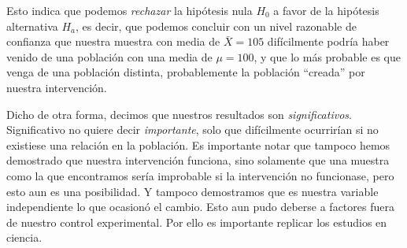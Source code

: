 \documentclass[a4paper,12pt]{article}
\begin{document}

Esto indica que podemos {\slshape rechazar} la hipótesis nula $H_{0}$ a favor de la hipótesis alternativa $H_{a}$, es decir, que podemos concluir con un nivel razonable de confianza que nuestra muestra con media de $\bar{X} = 105$ difícilmente podría haber venido de una población con una media de $\mu = 100$, y que lo más probable es que venga de una población distinta, probablemente la población ``creada'' por nuestra intervención.

Dicho de otra forma, decimos que nuestros resultados son {\slshape significativos}. Significativo no quiere decir {\slshape importante}, solo que difícilmente ocurrirían si no existiese una relación en la población. Es importante notar que tampoco hemos demostrado que nuestra intervención funciona, sino solamente que una muestra como la que encontramos sería improbable si la intervención no funcionase, pero esto aun es una posibilidad. Y tampoco demostramos que es nuestra variable independiente lo que ocasionó el cambio. Esto aun pudo deberse a factores fuera de nuestro control experimental. Por ello es importante replicar los estudios en ciencia.
\end{document}
